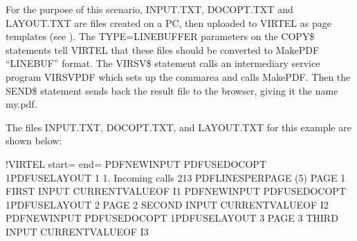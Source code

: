 \documentclass[letterpaper,10pt,english]{sphinxmanual}
\begin{document}

For the purpose of this scenario, INPUT.TXT, DOCOPT.TXT and LAYOUT.TXT are files created on a PC, then uploaded to
VIRTEL as page templates (see {\hyperref[\detokenize{User_Guide:v457ug-uploading-html-pages}]{}}). The TYPE=LINEBUFFER parameters on the COPY\$
statements tell VIRTEL that these files should be converted to MakePDF “LINEBUF” format. The VIRSV\$ statement calls
an intermediary service program VIRSVPDF which sets up the commarea and calls MakePDF. Then the SEND\$
statement sends back the result file to the browser, giving it the name my.pdf.

The files INPUT.TXT, DOCOPT.TXT, and LAYOUT.TXT for this example are shown below:

\begin{sphinxVerbatim}[commandchars=\\\{\}]
\PYGZlt{}!\PYGZhy{}\PYGZhy{}VIRTEL start=\PYGZdq{}\PYGZob{}\PYGZob{}\PYGZob{}\PYGZdq{} end=\PYGZdq{}\PYGZcb{}\PYGZcb{}\PYGZcb{}\PYGZdq{} \PYGZhy{}\PYGZhy{}\PYGZgt{}
\PYGZob{}\PYGZob{}\PYGZob{}PDF\PYGZhy{}NEW\PYGZhy{}INPUT \PYGZcb{}\PYGZcb{}\PYGZcb{}\PYGZob{}\PYGZob{}\PYGZob{}PDF\PYGZhy{}USE\PYGZhy{}DOCOPT \PYGZdq{}1\PYGZdq{}\PYGZcb{}\PYGZcb{}\PYGZcb{}\PYGZob{}\PYGZob{}\PYGZob{}PDF\PYGZhy{}USE\PYGZhy{}LAYOUT \PYGZdq{}1\PYGZdq{}\PYGZcb{}\PYGZcb{}\PYGZcb{}
1. Incoming calls
213
\PYGZob{}\PYGZob{}\PYGZob{}PDF\PYGZhy{}LINES\PYGZhy{}PER\PYGZhy{}PAGE (5) \PYGZcb{}\PYGZcb{}\PYGZcb{}
PAGE 1 FIRST INPUT
\PYGZob{}\PYGZob{}\PYGZob{}CURRENT\PYGZhy{}VALUE\PYGZhy{}OF \PYGZdq{}I1\PYGZdq{}\PYGZcb{}\PYGZcb{}\PYGZcb{}
\PYGZob{}\PYGZob{}\PYGZob{}PDF\PYGZhy{}NEW\PYGZhy{}INPUT \PYGZcb{}\PYGZcb{}\PYGZcb{}\PYGZob{}\PYGZob{}\PYGZob{}PDF\PYGZhy{}USE\PYGZhy{}DOCOPT \PYGZdq{}1\PYGZdq{}\PYGZcb{}\PYGZcb{}\PYGZcb{}\PYGZob{}\PYGZob{}\PYGZob{}PDF\PYGZhy{}USE\PYGZhy{}LAYOUT \PYGZdq{}2\PYGZdq{}\PYGZcb{}\PYGZcb{}\PYGZcb{}
PAGE 2 SECOND INPUT
\PYGZob{}\PYGZob{}\PYGZob{}CURRENT\PYGZhy{}VALUE\PYGZhy{}OF \PYGZdq{}I2\PYGZdq{}\PYGZcb{}\PYGZcb{}\PYGZcb{}
\PYGZob{}\PYGZob{}\PYGZob{}PDF\PYGZhy{}NEW\PYGZhy{}INPUT \PYGZcb{}\PYGZcb{}\PYGZcb{}\PYGZob{}\PYGZob{}\PYGZob{}PDF\PYGZhy{}USE\PYGZhy{}DOCOPT \PYGZdq{}1\PYGZdq{}\PYGZcb{}\PYGZcb{}\PYGZcb{}\PYGZob{}\PYGZob{}\PYGZob{}PDF\PYGZhy{}USE\PYGZhy{}LAYOUT \PYGZdq{}3\PYGZdq{}\PYGZcb{}\PYGZcb{}\PYGZcb{}
PAGE 3 THIRD INPUT
\PYGZob{}\PYGZob{}\PYGZob{}CURRENT\PYGZhy{}VALUE\PYGZhy{}OF \PYGZdq{}I3\PYGZdq{}\PYGZcb{}\PYGZcb{}\PYGZcb{}
\end{sphinxVerbatim}
\end{document}

